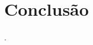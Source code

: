 \documentclass[	12pt, Times, openright, twoside, a4paper, english, brazil]{abntex2}
\begin{document}
  \chapter{Conclusão}
    .









\end{document}
